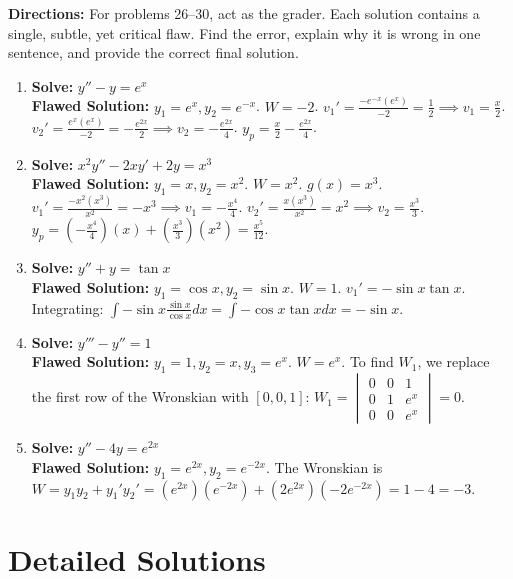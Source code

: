 \documentclass[11pt]{article}
\begin{document}
\textbf{Directions:} For problems 26--30, act as the grader. Each solution contains a single, subtle, yet critical flaw. Find the error, explain why it is wrong in one sentence, and provide the correct final solution.
\begin{enumerate}[resume]
    \item \textbf{Solve:} $y'' - y = e^x$ \\
    \textbf{Flawed Solution:} $y_1 = e^x, y_2 = e^{-x}$. $W = -2$. $v_1' = \frac{-e^{-x}(e^x)}{-2} = \frac{1}{2} \implies v_1 = \frac{x}{2}$. $v_2' = \frac{e^x(e^x)}{-2} = -\frac{e^{2x}}{2} \implies v_2 = -\frac{e^{2x}}{4}$. $y_p = \frac{x}{2} - \frac{e^{2x}}{4}$.
    
    \item \textbf{Solve:} $x^2 y'' - 2xy' + 2y = x^3$ \\
    \textbf{Flawed Solution:} $y_1 = x, y_2 = x^2$. $W = x^2$. $g(x) = x^3$. $v_1' = \frac{-x^2(x^3)}{x^2} = -x^3 \implies v_1 = -\frac{x^4}{4}$. $v_2' = \frac{x(x^3)}{x^2} = x^2 \implies v_2 = \frac{x^3}{3}$. $y_p = (-\frac{x^4}{4})(x) + (\frac{x^3}{3})(x^2) = \frac{x^5}{12}$.
    
    \item \textbf{Solve:} $y'' + y = \tan x$ \\
    \textbf{Flawed Solution:} $y_1 = \cos x, y_2 = \sin x$. $W = 1$. $v_1' = -\sin x \tan x$. Integrating: $\int -\sin x \frac{\sin x}{\cos x} dx = \int -\cos x \tan x dx = -\sin x$.
    
    \item \textbf{Solve:} $y''' - y'' = 1$ \\
    \textbf{Flawed Solution:} $y_1 = 1, y_2 = x, y_3 = e^x$. $W = e^x$. To find $W_1$, we replace the first row of the Wronskian with $[0, 0, 1]$: $W_1 = \begin{vmatrix} 0 & 0 & 1 \\ 0 & 1 & e^x \\ 0 & 0 & e^x \end{vmatrix} = 0$.
    
    \item \textbf{Solve:} $y'' - 4y = e^{2x}$ \\
    \textbf{Flawed Solution:} $y_1 = e^{2x}, y_2 = e^{-2x}$. The Wronskian is $W = y_1 y_2 + y_1' y_2' = (e^{2x})(e^{-2x}) + (2e^{2x})(-2e^{-2x}) = 1 - 4 = -3$.
\end{enumerate}

\newpage

\section{Detailed Solutions}
\end{document}
